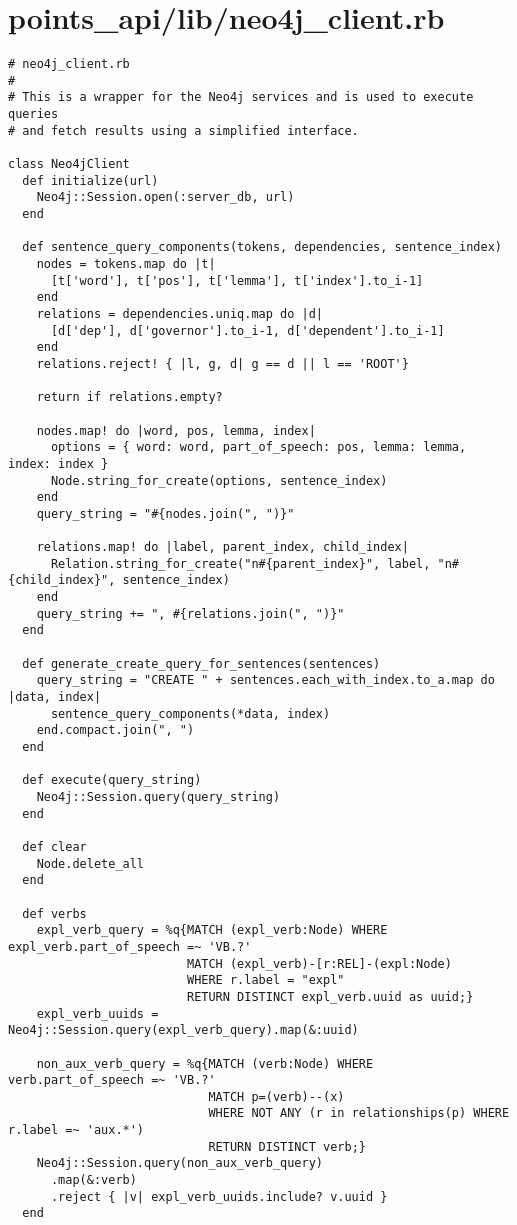 \documentclass{article}
\begin{document}
\section*{points\_api/lib/neo4j\_client.rb}
\begin{verbatim}
# neo4j_client.rb
#
# This is a wrapper for the Neo4j services and is used to execute queries
# and fetch results using a simplified interface.

class Neo4jClient
  def initialize(url)
    Neo4j::Session.open(:server_db, url)
  end

  def sentence_query_components(tokens, dependencies, sentence_index)
    nodes = tokens.map do |t|
      [t['word'], t['pos'], t['lemma'], t['index'].to_i-1]
    end
    relations = dependencies.uniq.map do |d|
      [d['dep'], d['governor'].to_i-1, d['dependent'].to_i-1]
    end
    relations.reject! { |l, g, d| g == d || l == 'ROOT'}

    return if relations.empty?

    nodes.map! do |word, pos, lemma, index|
      options = { word: word, part_of_speech: pos, lemma: lemma, index: index }
      Node.string_for_create(options, sentence_index)
    end
    query_string = "#{nodes.join(", ")}"

    relations.map! do |label, parent_index, child_index|
      Relation.string_for_create("n#{parent_index}", label, "n#{child_index}", sentence_index)
    end
    query_string += ", #{relations.join(", ")}"
  end

  def generate_create_query_for_sentences(sentences)
    query_string = "CREATE " + sentences.each_with_index.to_a.map do |data, index|
      sentence_query_components(*data, index)
    end.compact.join(", ")
  end

  def execute(query_string)
    Neo4j::Session.query(query_string)
  end

  def clear
    Node.delete_all
  end

  def verbs
    expl_verb_query = %q{MATCH (expl_verb:Node) WHERE expl_verb.part_of_speech =~ 'VB.?'
                         MATCH (expl_verb)-[r:REL]-(expl:Node)
                         WHERE r.label = "expl"
                         RETURN DISTINCT expl_verb.uuid as uuid;}
    expl_verb_uuids = Neo4j::Session.query(expl_verb_query).map(&:uuid)

    non_aux_verb_query = %q{MATCH (verb:Node) WHERE verb.part_of_speech =~ 'VB.?'
                            MATCH p=(verb)--(x)
                            WHERE NOT ANY (r in relationships(p) WHERE r.label =~ 'aux.*')
                            RETURN DISTINCT verb;}
    Neo4j::Session.query(non_aux_verb_query)
      .map(&:verb)
      .reject { |v| expl_verb_uuids.include? v.uuid }
  end


\end{verbatim}
\end{document}

